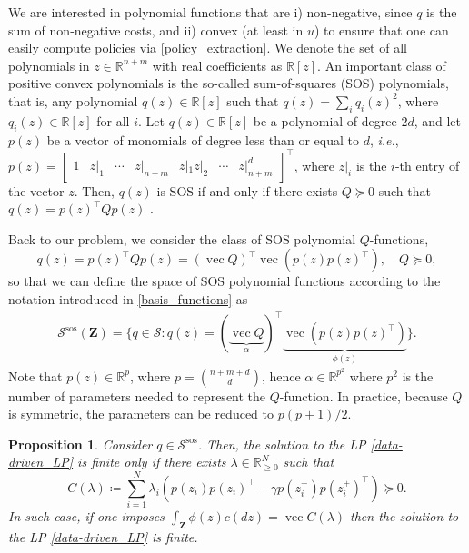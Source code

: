 \documentclass[journal,twoside,web]{ieeecolor}
\newtheorem{prop}{Proposition}
\newcommand{\Sc}{\mathcal{S}}
\newcommand{\Zb}{\mathbf{Z}}
\DeclareMathOperator{\vect}{vec}
\begin{document}
\iffalse 
We are interested in polynomial functions that are i) non-negative, since $q$ is the sum of non-negative costs, and ii) convex (at least in $u$) to ensure that one can easily compute policies via \eqref{policy_extraction}. We denote the set of all polynomials in $z\in\mathbb{R}^{n+m}$ with real coefficients as $\mathbb{R}[z]$.
An important class of positive convex polynomials is the so-called sum-of-squares (SOS) polynomials, that is, any polynomial $q(z)\in\mathbb{R}[z]$ such that $q(z)=\sum_i q_i(z)^2$, where $q_i(z)\in\mathbb{R}[z]$ for all $i$. Let $q(z)\in\mathbb{R}[z]$ be a polynomial of degree $2d$, and let $p(z)$ be a vector of monomials of degree less than or equal to $d$, \textit{i.e.}, $p(z)=\begin{bmatrix}
    1 & z|_1 & \cdots & z|_{n+m} & z|_1z|_2 & \cdots & z|_{n+m}^d \end{bmatrix}^\top$, where $z|_i$ is the $i$-th entry of the vector $z$. Then, $q(z)$ is SOS if and only if there exists $Q\succeq0$ such that $q(z)=p(z)^\top Q p(z)$ \cite{LasserrePoly}.
    
Back to our problem, we consider the class of SOS polynomial $Q$-functions,
%
\begin{equation*}
		q(z) = p(z)^\top Q p(z) 
		 = (\vect Q)^\top \vect(p(z)p(z)^\top), \quad Q\succeq0,
\end{equation*} 
%
so that we can define the space of SOS polynomial functions according to the notation introduced in \eqref{basis_functions} as
%
\begin{equation*}
	\begin{aligned}
		\Sc^{\text{sos}} (\Zb) =  \{ q\in\Sc : q(z) = (\underbrace{\vect Q}_{\alpha})^\top \underbrace{\vect(p(z)p(z)^\top)}_{\phi(z)} \}.
	\end{aligned}
\end{equation*} 
%
Note that $p(z) \in \mathbb{R}^p$, where $p=\binom{n+m+d}{d}$, hence $\alpha\in\mathbb{R}^{p^2}$ where $p^2$ is the number of parameters needed to represent the $Q$-function. In practice, because $Q$ is symmetric, the parameters can be reduced to $p(p+1)/2$.

\begin{prop} \label{prop:SOS}
	Consider $q\in\Sc^{\text{sos}}$. Then, the solution to the LP \eqref{data-driven_LP} is finite only if there exists $\lambda\in\mathbb{R}^N_{\ge0}$ such that 
	\begin{equation}
		C(\lambda) \coloneq \sum_{i=1}^{N} \lambda_i \left(p(z_i)p(z_i)^\top -\gamma p(z_i^+)p(z_i^+)^\top\right) \succeq 0.
	\end{equation}
In such case, if one imposes $\int_{\Zb} \phi (z) c(dz) = \vect C(\lambda)$ then the solution to the LP \eqref{data-driven_LP} is finite.
\end{prop}
\end{document}
